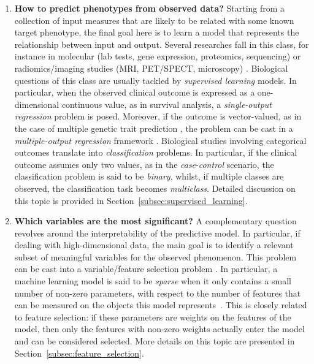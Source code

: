 \begin{enumerate}
	
	\item[] \textbf{How to predict phenotypes from observed data?}
	Starting from a collection of input measures that are likely to be related with some known target phenotype, the final goal here is to learn a model that represents the relationship between input and output. Several researches fall in this class, for instance in molecular (\eg lab tests, gene expression, proteomics, sequencing) \cite{angermueller2016deep, okser2014regularized, abraham2013performance} or radiomics/imaging studies (\eg \ac{MRI}, \ac{PET}/\ac{SPECT}, microscopy) \cite{min2016deep, helmstaedter2013connectomic}. Biological questions of this class are usually tackled by \textit{supervised learning} models. In particular, when the observed clinical outcome is expressed as a one-dimensional continuous value, as in survival analysis, a \textit{single-output regression} problem is posed. Moreover, if the outcome is vector-valued, as in the case of multiple genetic trait prediction \cite{he2016novel}, the problem can be cast in a \textit{multiple-output regression }framework \cite{argyriou2008convex, baldassarre2012multi}. Biological studies involving categorical outcomes translate into \textit{classification} problems. In particular, if the clinical outcome assumes only two values, as in the \textit{case}-\textit{control} scenario, the classification problem is said to be \textit{binary}, whilst, if multiple classes are observed, the classification task becomes \textit{multiclass}. Detailed discussion on this topic is provided in Section~\ref{subsec:supervised_learning}.
	
	\item[] \textbf{Which variables are the most significant?}
	A complementary question revolves around the interpretability of the predictive model. In particular, if dealing with high-dimensional data, the main goal is to identify a relevant subset of meaningful variables for the observed phenomenon. This problem can be cast into a variable/feature selection problem \cite{guyon2002gene}. %
	In particular, a machine learning model is said to be \textit{sparse} when it only contains a small number of non-zero parameters, with respect to the number of features that can be measured on the objects this model represents~\cite{hastie2015statistical, meier2008group}. This is closely related to feature selection: if these parameters are weights on the features of the model, then only the features with non-zero weights actually enter the model and can be considered selected. More details on this topic are presented in Section~\ref{subsec:feature_selection}.
	

\end{enumerate}
